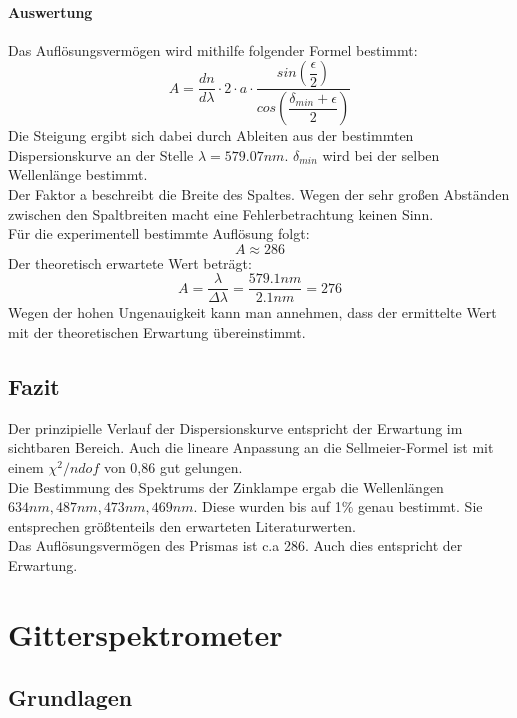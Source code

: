 \documentclass[12pt,a4paper]{article}
\begin{document}
	\paragraph{Auswertung}
	Das Auflösungsvermögen wird mithilfe folgender Formel bestimmt:
	\begin{equation}
	A = \dfrac{dn}{d\lambda}\cdot 2\cdot a\cdot\dfrac{sin\left(\dfrac{\epsilon}{2}\right)}{cos\left(\dfrac{\delta_{min}+\epsilon}{2}\right)}
	\end{equation}
	Die Steigung ergibt sich dabei durch Ableiten aus der bestimmten Dispersionskurve an der Stelle $\lambda = 579.07 nm$. $\delta_{min}$ wird bei der selben Wellenlänge bestimmt.\\
	Der Faktor a beschreibt die Breite des Spaltes.
	Wegen der sehr großen Abständen zwischen den Spaltbreiten macht eine Fehlerbetrachtung keinen Sinn.\\
	Für die experimentell bestimmte Auflösung folgt:
	\begin{equation}
	A \approx 286
	\end{equation}
	Der theoretisch erwartete Wert beträgt:
	\begin{equation}
	A = \dfrac{\lambda}{\Delta \lambda} = \dfrac{579.1 nm}{2.1 nm} = 276
	\end{equation}
	Wegen der hohen Ungenauigkeit kann man annehmen, dass der ermittelte Wert mit der theoretischen Erwartung übereinstimmt.
	
	
	
\subsection{Fazit}
Der prinzipielle Verlauf der Dispersionskurve entspricht der Erwartung im sichtbaren Bereich. Auch die lineare Anpassung an die Sellmeier-Formel ist mit einem $\chi^2/ndof$ von 0,86 gut gelungen.\\
Die Bestimmung des Spektrums der Zinklampe ergab die Wellenlängen $634nm, 487nm, 473 nm, 469nm $. Diese wurden bis auf 1\% genau bestimmt. Sie entsprechen größtenteils den erwarteten Literaturwerten.\\
Das Auflösungsvermögen des Prismas ist c.a 286. Auch dies entspricht der Erwartung.
	
\newpage
\section{Gitterspektrometer}

\subsection{Grundlagen}
\end{document}
